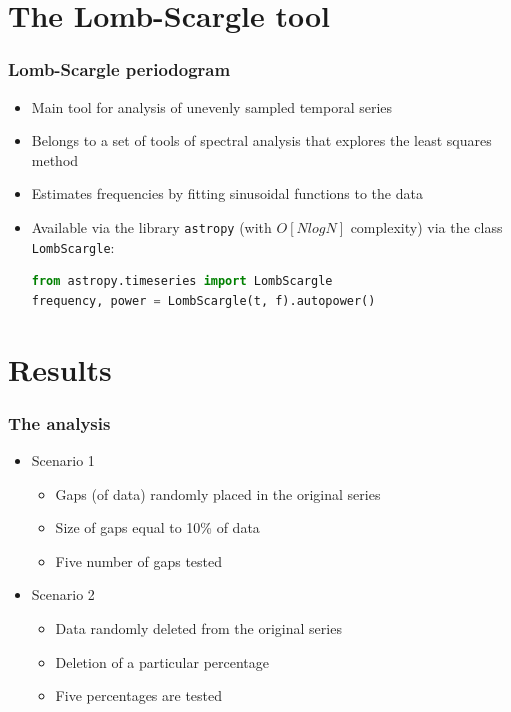\documentclass{beamer}
\begin{document}
\section{The Lomb-Scargle tool}

\begin{frame}[fragile]
\frametitle{Lomb-Scargle periodogram}
\begin{itemize}
\item Main tool for analysis of unevenly sampled temporal series 
\item Belongs to a set of tools of spectral analysis that explores the least squares method
\item Estimates frequencies by fitting sinusoidal functions to the data
\item Available via the library \texttt{astropy} (with $O[NlogN]$ complexity) via the class \texttt{LombScargle}:
\begin{lstlisting}[language=python,style=mystyle2]
from astropy.timeseries import LombScargle
frequency, power = LombScargle(t, f).autopower()
\end{lstlisting}
\end{itemize}
\end{frame}

\section{Results}

\begin{frame}
\frametitle{The analysis}
\begin{itemize}
\item Scenario 1
\begin{itemize}
\item Gaps (of data) randomly placed in the original series
\item Size of gaps equal to 10\% of data
\item Five number of gaps tested
\end{itemize}
\item Scenario 2
\begin{itemize}
\item Data randomly deleted from the original series
\item Deletion of a particular percentage 
\item Five percentages are tested
\end{itemize}
\end{itemize}
\end{frame}
\end{document}
